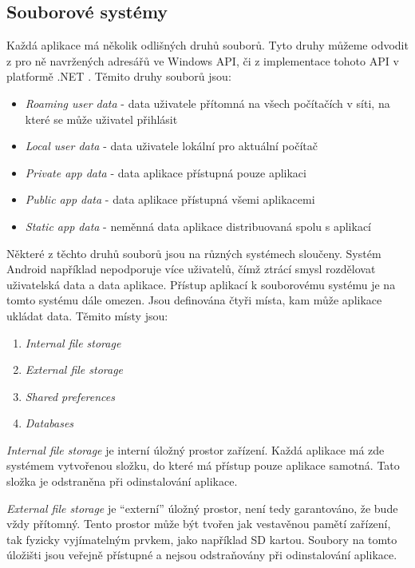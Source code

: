 \subsection{Souborové systémy}
\label{sec:filesystems}
Každá aplikace má několik odlišných druhů souborů. Tyto druhy můžeme odvodit z pro ně navržených adresářů ve Windows API\citep{site:knownfolders}, či z implementace tohoto API v platformě .NET \citep{site:specialfolders}. Těmito druhy souborů jsou:
\begin{itemize}
	\item \textit{Roaming user data} - data uživatele přítomná na všech počítačích v síti, na které se může uživatel přihlásit
	\item \textit{Local user data} - data uživatele lokální pro aktuální počítač
	\item \textit{Private app data} - data aplikace přístupná pouze aplikaci
	\item \textit{Public app data} - data aplikace přístupná všemi aplikacemi
	\item \textit{Static app data} - neměnná data aplikace distribuovaná spolu s aplikací
\end{itemize} 

Některé z těchto druhů souborů jsou na různých systémech sloučeny. Systém Android například nepodporuje více uživatelů, čímž ztrácí smysl rozdělovat uživatelská data a data aplikace. Přístup aplikací k souborovému systému je na tomto systému dále omezen. Jsou definována čtyři místa, kam může aplikace ukládat data\citep{site:androiddata}. Těmito místy jsou:

\begin{enumerate}
	\item \textit{Internal file storage}
	\item \textit{External file storage}
	\item \textit{Shared preferences}
	\item \textit{Databases}
\end{enumerate}

\textit{Internal file storage} je interní úložný prostor zařízení. Každá aplikace má zde systémem vytvořenou složku, do které má přístup pouze aplikace samotná. Tato složka je odstraněna při odinstalování aplikace.

\textit{External file storage} je ``externí'' úložný prostor, není tedy garantováno, že bude vždy přítomný. Tento prostor může být tvořen jak vestavěnou pamětí zařízení, tak fyzicky vyjímatelným prvkem, jako například SD kartou. Soubory na tomto úložišti jsou veřejně přístupné a nejsou odstraňovány při odinstalování aplikace. 

